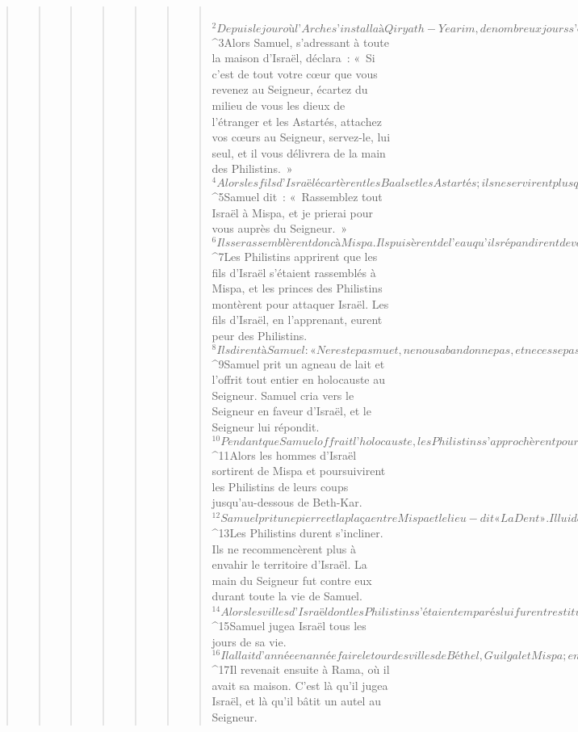 \begin{verse}
\begin{verse}
\begin{verse}
\begin{verse}
\begin{verse}
\begin{verse}
\begin{verse}
         
${}^{2}Depuis le jour où l’Arche s’installa à Qiryath-Yearim, de nombreux jours s’étaient écoulés, vingt ans déjà, lorsque toute la maison d’Israël se mit à soupirer après le Seigneur. 
${}^{3}Alors Samuel, s’adressant à toute la maison d’Israël, déclara : « Si c’est de tout votre cœur que vous revenez au Seigneur, écartez du milieu de vous les dieux de l’étranger et les Astartés, attachez vos cœurs au Seigneur, servez-le, lui seul, et il vous délivrera de la main des Philistins. » 
${}^{4}Alors les fils d’Israël écartèrent les Baals et les Astartés ; ils ne servirent plus que le Seigneur seul.
${}^{5}Samuel dit : « Rassemblez tout Israël à Mispa, et je prierai pour vous auprès du Seigneur. » 
${}^{6}Ils se rassemblèrent donc à Mispa. Ils puisèrent de l’eau qu’ils répandirent devant le Seigneur. Ce jour-là, ils jeûnèrent, et ils déclarèrent en ce lieu : « Nous avons péché contre le Seigneur. » Et Samuel jugea les fils d’Israël à Mispa.
${}^{7}Les Philistins apprirent que les fils d’Israël s’étaient rassemblés à Mispa, et les princes des Philistins montèrent pour attaquer Israël. Les fils d’Israël, en l’apprenant, eurent peur des Philistins. 
${}^{8}Ils dirent à Samuel : « Ne reste pas muet, ne nous abandonne pas, et ne cesse pas de crier vers le Seigneur notre Dieu, pour qu’il nous sauve de la main des Philistins ! » 
${}^{9}Samuel prit un agneau de lait et l’offrit tout entier en holocauste au Seigneur. Samuel cria vers le Seigneur en faveur d’Israël, et le Seigneur lui répondit. 
${}^{10}Pendant que Samuel offrait l’holocauste, les Philistins s’approchèrent pour combattre Israël. Mais, ce jour-là, le Seigneur tonna d’une grande voix contre les Philistins ; il les frappa de panique, et ils furent battus devant Israël. 
${}^{11}Alors les hommes d’Israël sortirent de Mispa et poursuivirent les Philistins de leurs coups jusqu’au-dessous de Beth-Kar. 
${}^{12}Samuel prit une pierre et la plaça entre Mispa et le lieu-dit « La Dent ». Il lui donna le nom d’Ébène-Ézèr (c’est-à-dire : Pierre du Secours), en disant : « Le Seigneur nous a secourus jusqu’ici. »
${}^{13}Les Philistins durent s’incliner. Ils ne recommencèrent plus à envahir le territoire d’Israël. La main du Seigneur fut contre eux durant toute la vie de Samuel. 
${}^{14}Alors les villes d’Israël dont les Philistins s’étaient emparés lui furent restituées, d’Éqrone à Gath, et Israël délivra leurs territoires de la main des Philistins. Il y eut la paix entre Israël et les Amorites. 
${}^{15}Samuel jugea Israël tous les jours de sa vie. 
${}^{16}Il allait d’année en année faire le tour des villes de Béthel, Guilgal et Mispa ; en tous ces lieux, il jugeait Israël. 
${}^{17}Il revenait ensuite à Rama, où il avait sa maison. C’est là qu’il jugea Israël, et là qu’il bâtit un autel au Seigneur.
      

\end{verse}
\end{verse}
\end{verse}
\end{verse}
\end{verse}
\end{verse}
\end{verse}

